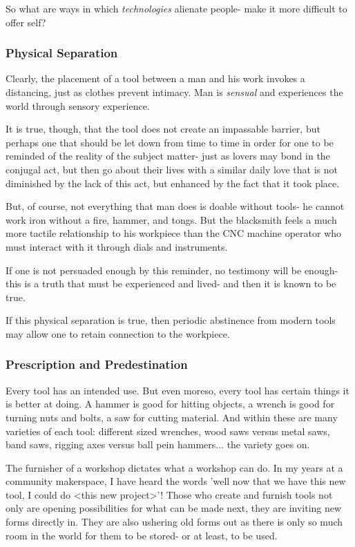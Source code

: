\documentclass[letterpaper]{article}
\begin{document}
So what are ways in which \textit{technologies} alienate people- make it more difficult to offer self?

\subsubsection{Physical Separation}

Clearly, the placement of a tool between a man and his work invokes a distancing, just as clothes prevent intimacy. Man is \textit{sensual} and experiences the world through sensory experience.

It is true, though, that the tool does not create an impassable barrier, but perhaps one that should be let down from time to time in order for one to be reminded of the reality of the subject matter- just as lovers may bond in the conjugal act, but then go about their lives with a similar daily love that is not diminished by the lack of this act, but enhanced by the fact that it took place.


But, of course, not everything that man does is doable without tools- he cannot work iron without a fire, hammer, and tongs. But the blacksmith feels a much more tactile relationship to his workpiece than the CNC machine operator who must interact with it through dials and instruments.

If one is not persuaded enough by this reminder, no testimony will be enough- this is a truth that must be experienced and lived- and then it is known to be true.

If this physical separation is true, then periodic abstinence from modern tools may allow one to retain connection to the workpiece.

\subsubsection{Prescription and Predestination}

Every tool has an intended use. But even moreso, every tool has certain things it is better at doing. A hammer is good for hitting objects, a wrench is good for turning nuts and bolts, a saw for cutting material. And within these are many varieties of each tool: different sized wrenches, wood saws versus metal saws, band saws, rigging axes versus ball pein hammers... the variety goes on.

The furnisher of a workshop dictates what a workshop can do. In my years at a community makerspace, I have heard the words 'well now that we have this new tool, I could do <this new project>'! Those who create and furnish tools not only are opening possibilities for what can be made next, they are inviting new forms directly in. They are also ushering old forms out as there is only so much room in the world for them to be stored- or at least, to be used.
\end{document}
